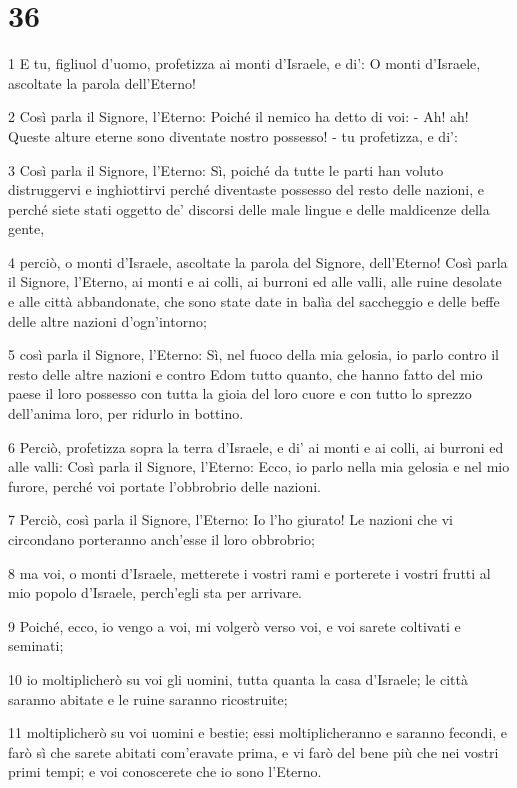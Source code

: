 \chapter{36}

\par 1 E tu, figliuol d'uomo, profetizza ai monti d'Israele, e di': O monti d'Israele, ascoltate la parola dell'Eterno!
\par 2 Così parla il Signore, l'Eterno: Poiché il nemico ha detto di voi: - Ah! ah! Queste alture eterne sono diventate nostro possesso! - tu profetizza, e di':
\par 3 Così parla il Signore, l'Eterno: Sì, poiché da tutte le parti han voluto distruggervi e inghiottirvi perché diventaste possesso del resto delle nazioni, e perché siete stati oggetto de' discorsi delle male lingue e delle maldicenze della gente,
\par 4 perciò, o monti d'Israele, ascoltate la parola del Signore, dell'Eterno! Così parla il Signore, l'Eterno, ai monti e ai colli, ai burroni ed alle valli, alle ruine desolate e alle città abbandonate, che sono state date in balìa del saccheggio e delle beffe delle altre nazioni d'ogn'intorno;
\par 5 così parla il Signore, l'Eterno: Sì, nel fuoco della mia gelosia, io parlo contro il resto delle altre nazioni e contro Edom tutto quanto, che hanno fatto del mio paese il loro possesso con tutta la gioia del loro cuore e con tutto lo sprezzo dell'anima loro, per ridurlo in bottino.
\par 6 Perciò, profetizza sopra la terra d'Israele, e di' ai monti e ai colli, ai burroni ed alle valli: Così parla il Signore, l'Eterno: Ecco, io parlo nella mia gelosia e nel mio furore, perché voi portate l'obbrobrio delle nazioni.
\par 7 Perciò, così parla il Signore, l'Eterno: Io l'ho giurato! Le nazioni che vi circondano porteranno anch'esse il loro obbrobrio;
\par 8 ma voi, o monti d'Israele, metterete i vostri rami e porterete i vostri frutti al mio popolo d'Israele, perch'egli sta per arrivare.
\par 9 Poiché, ecco, io vengo a voi, mi volgerò verso voi, e voi sarete coltivati e seminati;
\par 10 io moltiplicherò su voi gli uomini, tutta quanta la casa d'Israele; le città saranno abitate e le ruine saranno ricostruite;
\par 11 moltiplicherò su voi uomini e bestie; essi moltiplicheranno e saranno fecondi, e farò sì che sarete abitati com'eravate prima, e vi farò del bene più che nei vostri primi tempi; e voi conoscerete che io sono l'Eterno.
